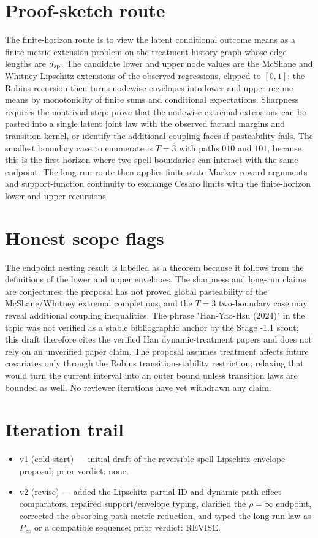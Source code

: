 \documentclass[11pt]{article}
\theoremstyle{definition}
\theoremstyle{plain}
\theoremstyle{remark}
\begin{document}
\section{Proof-sketch route}
The finite-horizon route is to view the latent conditional outcome means as a
finite metric-extension problem on the treatment-history graph whose edge
lengths are \(d_{\rm sp}\).  The candidate lower and upper node values are the
McShane and Whitney Lipschitz extensions of the observed regressions, clipped to
\([0,1]\); the Robins recursion then turns nodewise envelopes into lower and
upper regime means by monotonicity of finite sums and conditional expectations.
Sharpness requires the nontrivial step: prove that the nodewise extremal
extensions can be pasted into a single latent joint law with the observed
factual margins and transition kernel, or identify the additional coupling
faces if pasteability fails.  The smallest boundary case to enumerate is
\(T=3\) with paths \(010\) and \(101\), because this is the first horizon where
two spell boundaries can interact with the same endpoint.  The long-run route
then applies finite-state Markov reward arguments and support-function
continuity to exchange Cesaro limits with the finite-horizon lower and upper
recursions.

\section{Honest scope flags}
The endpoint nesting result is labelled as a theorem because it follows from
the definitions of the lower and upper envelopes.  The sharpness and long-run
claims are conjectures: the proposal has not proved global pasteability of the
McShane/Whitney extremal completions, and the \(T=3\) two-boundary case may
reveal additional coupling inequalities.  The phrase "Han-Yao-Hsu (2024)" in
the topic was not verified as a stable bibliographic anchor by the Stage -1.1
scout; this draft therefore cites the verified Han dynamic-treatment papers and
does not rely on an unverified paper claim.  The proposal assumes treatment
affects future covariates only through the Robins transition-stability
restriction; relaxing that would turn the current interval into an outer bound
unless transition laws are bounded as well.  No reviewer iterations have yet
withdrawn any claim.

\section{Iteration trail}
\begin{itemize}[leftmargin=*]
\item v1 (cold-start) --- initial draft of the reversible-spell Lipschitz
  envelope proposal; prior verdict: none.
\item v2 (revise) --- added the Lipschitz partial-ID and dynamic path-effect
  comparators, repaired support/envelope typing, clarified the
  \(\rho=\infty\) endpoint, corrected the absorbing-path metric reduction, and
  typed the long-run law as \(P_\infty\) or a compatible sequence; prior
  verdict: REVISE.
\end{itemize}
\end{document}
